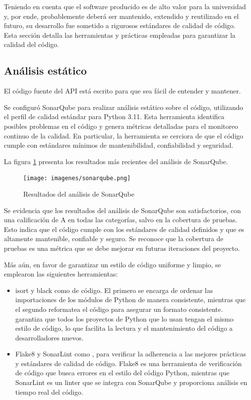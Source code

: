 Teniendo en cuenta que el software producido es de alto valor para la universidad y, por ende, probablemente deberá ser mantenido, extendido y reutilizado en el futuro, su desarrollo fue sometido a rigurosos estándares de calidad de código. Esta sección detalla las herramientas y prácticas empleadas para garantizar la calidad del código.

\subsection{Análisis estático}

El código fuente del \gls{API} está escrito para que sea fácil de entender y mantener.

Se configuró \gls{SonarQube} para realizar análisis estático sobre el código, utilizando el \gls{perfil de calidad} estándar para \gls{Python} 3.11. Esta herramienta identifica posibles problemas en el código y genera métricas detalladas para el monitoreo continuo de la calidad. En particular, la herramienta se cerciora de que el código cumple con estándares mínimos de mantenibilidad, confiabilidad y seguridad.

La figura \ref{fig:sonarqube} presenta los resultados más recientes del análisis de \gls{SonarQube}.

\begin{figure}[H]
	\centering
	\texttt{[image: imagenes/sonarqube.png]}
	\caption{Resultados del análisis de \gls{SonarQube}}
	\label{fig:sonarqube}
\end{figure}

Se evidencia que los resultados del análisis de \gls{SonarQube} son satisfactorios, con una calificación de A en todas las categorías, salvo en la cobertura de pruebas. Esto indica que el código cumple con los estándares de calidad definidos y que es altamente mantenible, confiable y seguro. Se reconoce que la cobertura de pruebas es una métrica que se debe mejorar en futuras iteraciones del proyecto. 

Más aún, en favor de garantizar un estilo de código uniforme y limpio, se emplearon las siguientes herramientas:
\begin{itemize}
	\item \gls{isort} y \gls{black} como  de código. El primero se encarga de ordenar las importaciones de los módulos de \gls{Python} de manera consistente, mientras que el segundo reformatea el código para asegurar un formato consistente.  garantiza que todos los proyectos de \gls{Python} que lo usan tengan el mismo estilo de código, lo que facilita la lectura y el mantenimiento del código a desarrolladores nuevos.
	\item \gls{Flake8} y \gls{SonarLint} como , para verificar la adherencia a las mejores prácticas y estándares de calidad de código. \gls{Flake8} es una herramienta de verificación de código que busca errores en el estilo del código \gls{Python}, mientras que \gls{SonarLint} es un \gls{linter} que se integra con \gls{SonarQube} y proporciona análisis en tiempo real del código.
\end{itemize}

